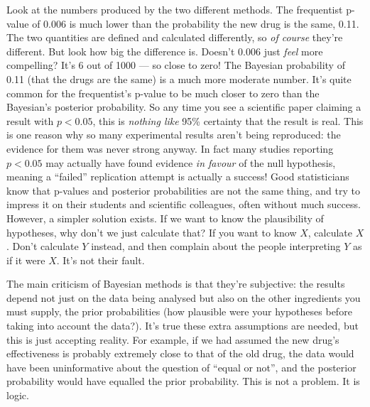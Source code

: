\documentclass[a4paper, 12pt]{article}
\begin{document}
Look at the numbers produced by the two different methods. The frequentist p-value of 0.006 is much lower than the probability the new drug is the same, 0.11.
The two quantities are defined and calculated differently, so {\em of course} they're different. But look how big the difference is.
Doesn't 0.006 just {\em feel}
more compelling? It's 6 out of 1000 --- so close to zero!
The Bayesian probability of 0.11 (that the drugs are the same) is a much
more moderate number. It's quite common for the frequentist's p-value to
be much closer to zero than the Bayesian's posterior probability.
So any time you see a scientific paper claiming a result with $p < 0.05$, this
is {\em nothing like} 95\% certainty that the result is real. This is one
reason why so many experimental results aren't being reproduced: the evidence
for them was never strong anyway. In fact many studies reporting $p < 0.05$
may actually have found evidence {\em in favour} of the null hypothesis, meaning
a ``failed'' replication attempt is actually a success!
Good statisticians know that p-values and posterior probabilities are not the
same thing, and try to impress it on their students and
scientific colleagues, often without much success.
However, a simpler solution exists. If we want to know
the plausibility of hypotheses, why don't we just calculate that? If you want
to know $X$, calculate $X$. Don't calculate $Y$ instead, and then complain
about the people interpreting $Y$ as if it were $X$. It's not their fault.

The main criticism of Bayesian methods is that they're subjective: the results
depend not just on the data being analysed but also on the other ingredients
you must supply, the prior probabilities (how plausible were your hypotheses
before taking into account the data?). It's true these extra assumptions are
needed, but this is just accepting reality. For example, if we had assumed
the new drug's effectiveness is probably extremely close to that of the old drug,
the data would have been uninformative about the question of ``equal or not'',
and the posterior probability would have equalled the prior probability. This
is not a problem. It is logic.
\end{document}
